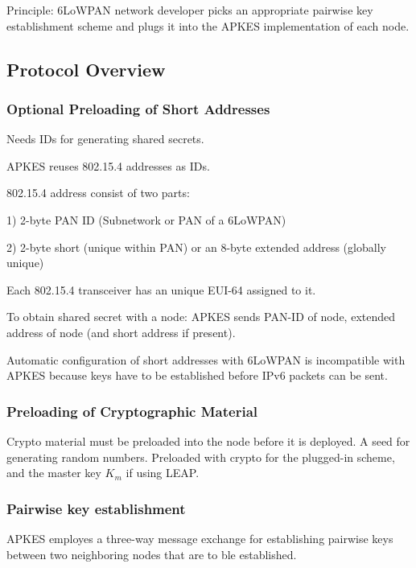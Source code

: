 \documentclass[10pt]{article}
\begin{document}
\noindent

Principle: 6LoWPAN network developer picks an appropriate pairwise key establishment scheme and plugs it into the APKES implementation of each node.

\subsection{Protocol Overview}

\subsubsection{Optional Preloading of Short Addresses}

\noindent

Needs IDs for generating shared secrets.

APKES reuses 802.15.4 addresses as IDs.

802.15.4 address consist of two parts:

1) 2-byte PAN ID (Subnetwork or PAN of a 6LoWPAN)

2) 2-byte short (unique within PAN) or an 8-byte extended address (globally unique)

Each 802.15.4 transceiver has an unique EUI-64 assigned to it.


To obtain shared secret with a node: APKES sends PAN-ID of node, extended address of node (and short address if present).

Automatic configuration of short addresses with 6LoWPAN is incompatible with APKES because keys have to be established before IPv6 packets can be sent.


\subsubsection{Preloading of Cryptographic Material}

Crypto material must be preloaded into the node before it is deployed. A seed for generating random numbers. Preloaded with crypto for the plugged-in scheme, and the master key $K_m$ if using LEAP.

\subsubsection{Pairwise key establishment} 

APKES employes a three-way message exchange for establishing pairwise keys between two neighboring nodes that are to ble established.
\end{document}

